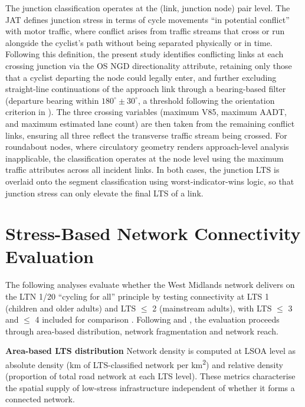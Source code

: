 The junction classification operates at the (link, junction node) pair level. The
JAT defines junction stress in terms of cycle movements ``in potential conflict''
with motor traffic, where conflict arises from traffic streams that cross or run
alongside the cyclist's path without being separated physically or in time.
Following this definition, the present study identifies conflicting links at each
crossing junction via the OS NGD directionality attribute, retaining only those that
a cyclist departing the node could legally enter, and further excluding straight-line
continuations of the approach link through a bearing-based filter (departure bearing
within $180^{\circ} \pm 30^{\circ}$, a threshold following the orientation criterion in
\textcite{mekuria2012a}). The three crossing variables (maximum V85, maximum AADT,
and maximum estimated lane count) are then taken from the remaining conflict links,
ensuring all three reflect the transverse traffic stream being crossed. For
roundabout nodes, where circulatory geometry renders approach-level analysis
inapplicable, the classification operates at the node level using the maximum
traffic attributes across all incident links. In both cases, the junction LTS is
overlaid onto the segment classification using worst-indicator-wins logic, so that
junction stress can only elevate the final LTS of a link.

\section{Stress-Based Network Connectivity Evaluation}
\label{sec:method-analysis}

The following analyses evaluate whether the West Midlands network delivers on the LTN 1/20 ``cycling for all'' principle by testing connectivity at LTS 1 (children and older adults) and LTS $\leq$ 2 (mainstream adults), with LTS $\leq$ 3 and $\leq$ 4 included for comparison \parencite{mekuria2012a,departmentfortransport2020a}. Following \textcite{viero2025} and \textcite{schon2024}, the evaluation proceeds through area-based distribution, network fragmentation and network reach.

\textbf{Area-based LTS distribution} Network density is computed at LSOA level as absolute density (km of LTS-classified network per km\textsuperscript{2}) and relative density (proportion of total road network at each LTS level). These metrics characterise the spatial supply of low-stress infrastructure independent of whether it forms a connected network.

